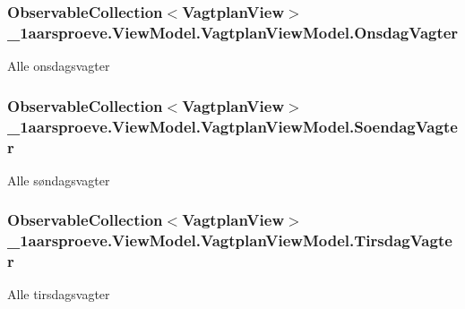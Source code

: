 \subsubsection[{Onsdag\+Vagter}]{\setlength{\rightskip}{0pt plus 5cm}Observable\+Collection$<${\bf Vagtplan\+View}$>$ \+\_\+1aarsproeve.\+View\+Model.\+Vagtplan\+View\+Model.\+Onsdag\+Vagter}\label{class__1aarsproeve_1_1_view_model_1_1_vagtplan_view_model_a4ea415eb2f1e6f7e82e4018e276d1197}


Alle onsdagsvagter 

\hypertarget{class__1aarsproeve_1_1_view_model_1_1_vagtplan_view_model_aa31e5b366c76da7a1a64ef568af2764c}{}
\subsubsection[{Soendag\+Vagter}]{\setlength{\rightskip}{0pt plus 5cm}Observable\+Collection$<${\bf Vagtplan\+View}$>$ \+\_\+1aarsproeve.\+View\+Model.\+Vagtplan\+View\+Model.\+Soendag\+Vagter}\label{class__1aarsproeve_1_1_view_model_1_1_vagtplan_view_model_aa31e5b366c76da7a1a64ef568af2764c}


Alle søndagsvagter 

\hypertarget{class__1aarsproeve_1_1_view_model_1_1_vagtplan_view_model_a7d6c62127834e177525b22eb6ddd2ab6}{}
\subsubsection[{Tirsdag\+Vagter}]{\setlength{\rightskip}{0pt plus 5cm}Observable\+Collection$<${\bf Vagtplan\+View}$>$ \+\_\+1aarsproeve.\+View\+Model.\+Vagtplan\+View\+Model.\+Tirsdag\+Vagter}\label{class__1aarsproeve_1_1_view_model_1_1_vagtplan_view_model_a7d6c62127834e177525b22eb6ddd2ab6}


Alle tirsdagsvagter 

\hypertarget{class__1aarsproeve_1_1_view_model_1_1_vagtplan_view_model_a85143514a9445a534a3518738e53df82}{}
